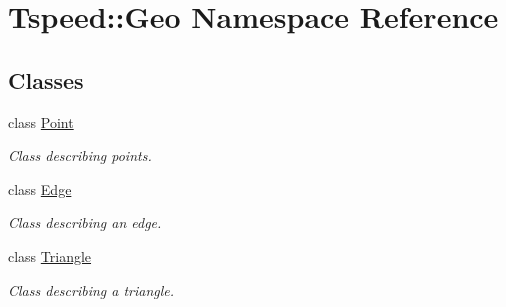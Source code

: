 \hypertarget{namespaceTspeed_1_1Geo}{\section{Tspeed\-:\-:Geo Namespace Reference}
\label{namespaceTspeed_1_1Geo}
}
\subsection*{Classes}
\begin{DoxyCompactItemize}
\item 
class \hyperlink{classTspeed_1_1Geo_1_1Point}{Point}
\begin{DoxyCompactList}\small\item\em Class describing points. \end{DoxyCompactList}\item 
class \hyperlink{classTspeed_1_1Geo_1_1Edge}{Edge}
\begin{DoxyCompactList}\small\item\em Class describing an edge. \end{DoxyCompactList}\item 
class \hyperlink{classTspeed_1_1Geo_1_1Triangle}{Triangle}
\begin{DoxyCompactList}\small\item\em Class describing a triangle. \end{DoxyCompactList}\end{DoxyCompactItemize}
